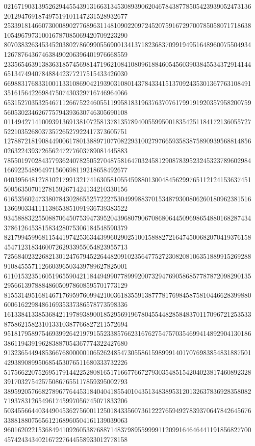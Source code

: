 \begin{DoxyCode}
      021671903139526294455439131663134530893906204678438778505423939052473136201294769187497519101147231528932677
      253391814660730008902776896311481090220972452075916729700785058071718638105496797310016787085069420709223290
      807038326345345203802786099055690013413718236837099194951648960075504934126787643674638490206396401976668559
      233565463913836318574569814719621084108096188460545603903845534372914144651347494078488442377217515433426030
      669883176833100113310869042193903108014378433415137092435301367763108491351615642269847507430329716746964066
      653152703532546711266752246055119958183196376370761799191920357958200759560530234626775794393630746305690108
      011494271410093913691381072581378135789400559950018354251184172136055727522103526803735726527922417373605751
      127887218190844900617801388971077082293100279766593583875890939568814856026322439372656247277603789081445883
      785501970284377936240782505270487581647032458129087839523245323789602984166922548964971560698119218658492677
      040395648127810217991321741630581055459880130048456299765112124153637451500563507012781592671424134210330156
      616535602473380784302865525722275304999883701534879300806260180962381516136690334111138653851091936739383522
      934588832255088706450753947395204396807906708680644509698654880168287434378612645381583428075306184548590379
      821799459968115441974253634439960290251001588827216474500682070419376158454712318346007262933955054823955713
      725684023226821301247679452264482091023564775272308208106351889915269288910845557112660396503439789627825001
      611015323516051965590421184494990778999200732947690586857787872098290135295661397888486050978608595701773129
      815531495168146717695976099421003618355913877781769845875810446628399880600616229848616935337386578773598336
      161338413385368421197893890018529569196780455448285848370117096721253533875862158231013310387766827211572694
      951817958975469399264219791552338576623167627547570354699414892904130186386119439196283887054367774322427680
      913236544948536676800000106526248547305586159899914017076983854831887501429389089950685453076511680333732226
      517566220752695179144225280816517166776672793035485154204023817460892328391703275425750867655117859395002793
      389592057668278967764453184040418554010435134838953120132637836928358082719378312654961745997056745071833206
      503455664403449045362756001125018433560736122276594927839370647842645676338818807565612168960504161139039063
      960162022153684941092605387688714837989559999112099164646441191856827700457424343402167227644558933012778158

\end{DoxyCode}
